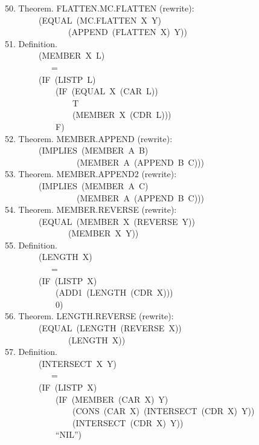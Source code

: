 \documentclass[10pt]{book}
\newenvironment{pubasis}{\begin{flushleft}}{\end{flushleft}}
\begin{document}
\begin{pubasis}
50.     Theorem.  FLATTEN.MC.FLATTEN (rewrite):\\
~~~~~~~~(EQUAL~(MC.FLATTEN~X~Y)\\
~~~~~~~~~~~~~~~(APPEND~(FLATTEN~X)~Y))\\

51.     Definition.\\
~~~~~~~~(MEMBER~X~L)\\
~~~~~~~~~~~=\\
~~~~~~~~(IF~(LISTP~L)\\
~~~~~~~~~~~~(IF~(EQUAL~X~(CAR~L))\\
~~~~~~~~~~~~~~~~T\\
~~~~~~~~~~~~~~~~(MEMBER~X~(CDR~L)))\\
~~~~~~~~~~~~F)\\

52.     Theorem.  MEMBER.APPEND (rewrite):\\
~~~~~~~~(IMPLIES~(MEMBER~A~B)\\
~~~~~~~~~~~~~~~~~(MEMBER~A~(APPEND~B~C)))\\

53.     Theorem.  MEMBER.APPEND2 (rewrite):\\
~~~~~~~~(IMPLIES~(MEMBER~A~C)\\
~~~~~~~~~~~~~~~~~(MEMBER~A~(APPEND~B~C)))\\

54.     Theorem.  MEMBER.REVERSE (rewrite):\\
~~~~~~~~(EQUAL~(MEMBER~X~(REVERSE~Y))\\
~~~~~~~~~~~~~~~(MEMBER~X~Y))\\

55.     Definition.\\
~~~~~~~~(LENGTH~X)\\
~~~~~~~~~~~=\\
~~~~~~~~(IF~(LISTP~X)\\
~~~~~~~~~~~~(ADD1~(LENGTH~(CDR~X)))\\
~~~~~~~~~~~~0)\\

56.     Theorem.  LENGTH.REVERSE (rewrite):\\
~~~~~~~~(EQUAL~(LENGTH~(REVERSE~X))\\
~~~~~~~~~~~~~~~(LENGTH~X))\\

57.     Definition.\\
~~~~~~~~(INTERSECT~X~Y)\\
~~~~~~~~~~~=\\
~~~~~~~~(IF~(LISTP~X)\\
~~~~~~~~~~~~(IF~(MEMBER~(CAR~X)~Y)\\
~~~~~~~~~~~~~~~~(CONS~(CAR~X)~(INTERSECT~(CDR~X)~Y))\\
~~~~~~~~~~~~~~~~(INTERSECT~(CDR~X)~Y))\\
~~~~~~~~~~~~``NIL'')\\


\end{pubasis}
\end{document}
